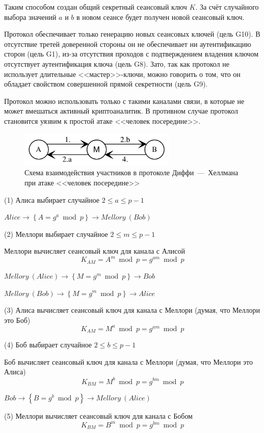 Таким способом создан общий секретный сеансовый ключ $K$. За счёт случайного выбора значений $a$ и $b$ в новом сеансе будет получен новой сеансовый ключ.

Протокол обеспечивает только генерацию новых сеансовых ключей (цель G10). В отсутствие третей доверенной стороны он не обеспечивает ни аутентификацию сторон (цель G1), из-за отсутствия проходов с подтверждением владения ключом отсутствует аутентификация ключа (цель G8). Зато, так как протокол не использует длительные <<мастер>>-ключи, можно говорить о том, что он обладает свойством совершенной прямой секретности (цель G9).

Протокол можно использовать только с такими каналами связи, в которые не может вмешаться активный криптоаналитик. В противном случае протокол становится уязвим к простой атаке <<человек посередине>>.

\begin{figure}
    \centering
    \includegraphics[width=0.67\textwidth]{pic/key_distribution-diffie-hellman-mitm}
    \caption{Схема взаимодействия участников в протоколе Диффи~---~Хеллмана при атаке <<человек посередине>>\label{fig:key_distribution-diffie-hellman-mitm}}
\end{figure}

\begin{protocol}
    \item[(1)] Алиса выбирает случайное $2 \leq a \leq p - 1$
    \item[{}] $Alice \to \left\{ A = g ^ a \bmod p \right\} \to Mellory~(Bob)$
    \item[(2)] Меллори выбирает случайное $2 \leq m \leq p-1$
    \item[{}] Меллори вычисляет сеансовый ключ для канала с Алисой
        \[K_{AM} = A ^ m \bmod p = g ^ {am} \bmod p\]
    \item[{}] $Mellory~(Alice) \to \left\{ M = g ^ m \bmod p \right\} \to Bob$
    \item[{}] $Mellory~(Bob) \to \left\{ M = g ^ m \bmod p \right\} \to Alice$
    \item[(3)] Алиса вычисляет сеансовый ключ для канала с Меллори (думая, что Меллори это Боб)
        \[K_{AM} = M ^ a \bmod p = g ^ { am } \bmod p\]
    \item[(4)] Боб выбирает случайное $2 \leq b \leq p-1$
    \item[{}] Боб вычисляет сеансовый ключ для канала с Меллори (думая, что Меллори это Алиса)
        \[K_{BM} = M ^ b \bmod p = g ^ { bm } \bmod p\]
    \item[{}] $Bob \to \left\{ B = g ^ b \bmod p \right\} \to Mellory~(Alice)$
    \item[(5)] Меллори вычисляет сеансовый ключ для канала с Бобом
        \[K_{BM} = B ^ m \bmod p = g ^ { bm } \bmod p\]
\end{protocol}

